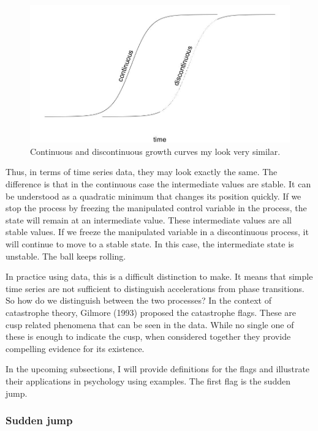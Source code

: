 \documentclass[
  a4paper,
  DIV=11,
  numbers=noendperiod,
  oneside]{scrreprt}
\begin{document}
\begin{figure}

{\centering \includegraphics{media/ch3/image18.jpg}

}

\caption{\label{fig-ch3-img18-old-30}Continuous and discontinuous growth
curves my look very similar.}

\end{figure}

Thus, in terms of time series data, they may look exactly the same. The
difference is that in the continuous case the intermediate values are
stable. It can be understood as a quadratic minimum that changes its
position quickly. If we stop the process by freezing the manipulated
control variable in the process, the state will remain at an
intermediate value. These intermediate values are all stable values. If
we freeze the manipulated variable in a discontinuous process, it will
continue to move to a stable state. In this case, the intermediate state
is unstable. The ball keeps rolling.

In practice using data, this is a difficult distinction to make. It
means that simple time series are not sufficient to distinguish
accelerations from phase transitions. So how do we distinguish between
the two processes? In the context of catastrophe theory, Gilmore (1993)
proposed the catastrophe flags. These are cusp related phenomena that
can be seen in the data. While no single one of these is enough to
indicate the cusp, when considered together they provide compelling
evidence for its existence.

In the upcoming subsections, I will provide definitions for the flags
and illustrate their applications in psychology using examples. The
first flag is the sudden jump.

\hypertarget{sec-Sudden-jump}{%
\subsubsection{Sudden jump}\label{sec-Sudden-jump}}
\end{document}
